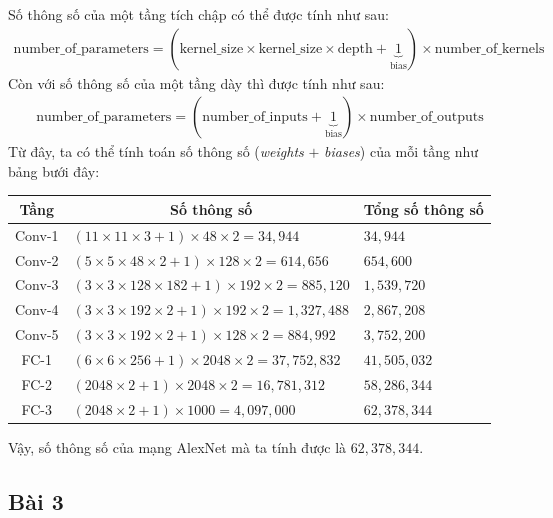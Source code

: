 \documentclass[a4paper]{article}
\begin{document}
\noindent
Số thông số của một tầng tích chập có thể được tính như sau:
\begin{align*}
    \text{number\_of\_parameters} = \left(\text{kernel\_size}\times \text{kernel\_size} \times \text{depth} + \underbrace{1}_\text{bias}\right)\times \text{number\_of\_kernels}
\end{align*}
Còn với số thông số của một tầng dày thì được tính như sau:
\begin{align*}
    \text{number\_of\_parameters} = \left(\text{number\_of\_inputs} + \underbrace{1}_\text{bias}\right) \times \text{number\_of\_outputs}
\end{align*}
Từ đây, ta có thể tính toán số thông số (\textit{weights} $+$ \textit{biases}) của mỗi tầng như bảng bưới đây:

\begin{table}[!h]
\centering
{\renewcommand{\arraystretch}{1.55}
\begin{tabular}{|c|l|l|}
\hline
\textbf{Tầng} & \multicolumn{1}{c|}{\textbf{Số thông số}} & \multicolumn{1}{c|}{\textbf{Tổng số thông số}}\\ \hline
Conv-1 & $(11 \times 11 \times 3 + 1)\times 48 \times 2 = 34,944$ & $34,944$ \\\hline
Conv-2 & $(5 \times 5 \times 48 \times 2 + 1)\times 128 \times 2 = 614,656$ & $654,600$ \\ \hline
Conv-3 & $(3 \times 3 \times 128 \times 182 + 1)\times 192 \times 2 = 885,120$ & $1,539,720$ \\ \hline
Conv-4 & $(3 \times 3 \times 192 \times 2 + 1)\times 192 \times 2 = 1,327,488$ & $2,867,208$ \\ \hline
Conv-5 & $(3 \times 3 \times 192 \times 2 + 1)\times 128 \times 2 = 884,992$ & $3,752,200$ \\ \hline
FC-1 & $(6 \times 6 \times 256 + 1)\times 2048 \times 2 = 37,752,832$ & $41,505,032$ \\ \hline
FC-2 & $(2048 \times 2 + 1)\times 2048 \times 2 = 16,781,312$ & $58,286,344$ \\ \hline
FC-3 & $(2048 \times 2 + 1)\times 1000 = 4,097,000$ & $62,378,344$ \\ \hline
\end{tabular}} \quad
\end{table}

\noindent
Vậy, số thông số của mạng AlexNet mà ta tính được là $62,378,344$.

\subsection{Bài 3}\label{bai3}
\end{document}
